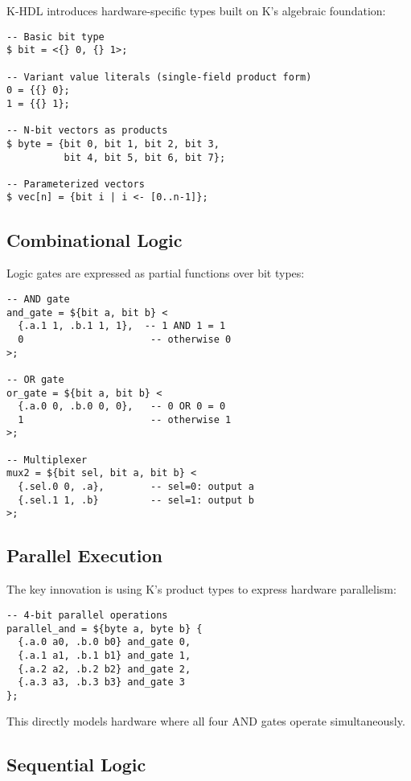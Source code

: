 \documentclass[10pt,twocolumn]{article}
\begin{document}
K-HDL introduces hardware-specific types built on K's algebraic foundation:

\begin{lstlisting}
-- Basic bit type
$ bit = <{} 0, {} 1>;

-- Variant value literals (single-field product form)
0 = {{} 0};
1 = {{} 1};

-- N-bit vectors as products
$ byte = {bit 0, bit 1, bit 2, bit 3, 
          bit 4, bit 5, bit 6, bit 7};

-- Parameterized vectors
$ vec[n] = {bit i | i <- [0..n-1]};
\end{lstlisting}

\subsection{Combinational Logic}

Logic gates are expressed as partial functions over bit types:

\begin{lstlisting}
-- AND gate
and_gate = ${bit a, bit b} <
  {.a.1 1, .b.1 1, 1},  -- 1 AND 1 = 1
  0                      -- otherwise 0
>;

-- OR gate  
or_gate = ${bit a, bit b} <
  {.a.0 0, .b.0 0, 0},   -- 0 OR 0 = 0
  1                      -- otherwise 1
>;

-- Multiplexer
mux2 = ${bit sel, bit a, bit b} <
  {.sel.0 0, .a},        -- sel=0: output a
  {.sel.1 1, .b}         -- sel=1: output b
>;
\end{lstlisting}

\subsection{Parallel Execution}

The key innovation is using K's product types to express hardware parallelism:

\begin{lstlisting}
-- 4-bit parallel operations
parallel_and = ${byte a, byte b} {
  {.a.0 a0, .b.0 b0} and_gate 0,
  {.a.1 a1, .b.1 b1} and_gate 1,
  {.a.2 a2, .b.2 b2} and_gate 2,
  {.a.3 a3, .b.3 b3} and_gate 3
};
\end{lstlisting}

This directly models hardware where all four AND gates operate simultaneously.

\subsection{Sequential Logic}
\end{document}
